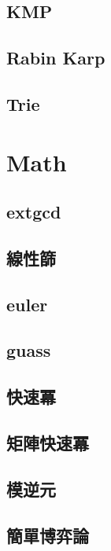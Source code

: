     \subsection{KMP}
        
    \subsection{Rabin Karp}
        
    \subsection{Trie}
        

\section{Math}
	\subsection{extgcd}
		
    \subsection{線性篩}
		
    \subsection{euler}
		    
    \subsection{guass}
		
    \subsection{快速冪}
		
    \subsection{矩陣快速冪}
		
    \subsection{模逆元}
		
    \subsection{簡單博弈論}
		
